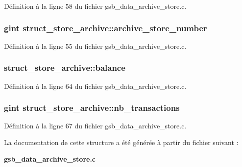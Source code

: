 Définition à la ligne 58 du fichier gsb\_\-data\_\-archive\_\-store.c.

\subsubsection[{archive\_\-store\_\-number}]{\setlength{\rightskip}{0pt plus 5cm}gint {\bf struct\_\-store\_\-archive::archive\_\-store\_\-number}}\label{structstruct__store__archive_a1426ccadcb57f23f0279a3936551e169}


Définition à la ligne 55 du fichier gsb\_\-data\_\-archive\_\-store.c.

\subsubsection[{balance}]{ {\bf struct\_\-store\_\-archive::balance}}\label{structstruct__store__archive_a2b9fc1c87c2cfe45a15801bb1971fe3d}


Définition à la ligne 64 du fichier gsb\_\-data\_\-archive\_\-store.c.

\subsubsection[{nb\_\-transactions}]{\setlength{\rightskip}{0pt plus 5cm}gint {\bf struct\_\-store\_\-archive::nb\_\-transactions}}\label{structstruct__store__archive_a26d86eccac8ff5f3371d6bb42eaf9bee}


Définition à la ligne 67 du fichier gsb\_\-data\_\-archive\_\-store.c.



La documentation de cette structure a été générée à partir du fichier suivant :\begin{DoxyCompactItemize}
\item 
{\bf gsb\_\-data\_\-archive\_\-store.c}\end{DoxyCompactItemize}
